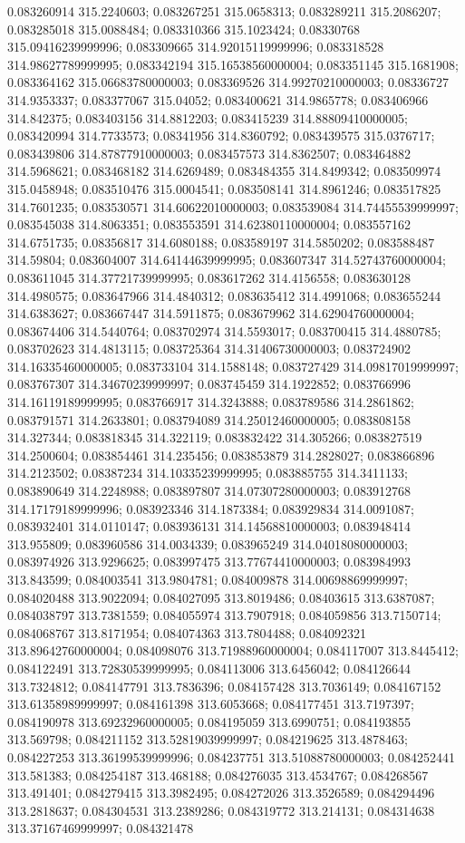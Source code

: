 0.083260914 315.2240603; 0.083267251 315.0658313; 0.083289211 315.2086207; 0.083285018 315.0088484; 0.083310366 315.1023424; 0.08330768 315.09416239999996; 0.083309665 314.92015119999996; 0.083318528 314.98627789999995; 0.083342194 315.16538560000004; 0.083351145 315.1681908; 0.083364162 315.06683780000003; 0.083369526 314.99270210000003; 0.08336727 314.9353337; 0.083377067 315.04052; 0.083400621 314.9865778; 0.083406966 314.842375; 0.083403156 314.8812203; 0.083415239 314.88809410000005; 0.083420994 314.7733573; 0.08341956 314.8360792; 0.083439575 315.0376717; 0.083439806 314.87877910000003; 0.083457573 314.8362507; 0.083464882 314.5968621; 0.083468182 314.6269489; 0.083484355 314.8499342; 0.083509974 315.0458948; 0.083510476 315.0004541; 0.083508141 314.8961246; 0.083517825 314.7601235; 0.083530571 314.60622010000003; 0.083539084 314.74455539999997; 0.083545038 314.8063351; 0.083553591 314.62380110000004; 0.083557162 314.6751735; 0.08356817 314.6080188; 0.083589197 314.5850202; 0.083588487 314.59804; 0.083604007 314.64144639999995; 0.083607347 314.52743760000004; 0.083611045 314.37721739999995; 0.083617262 314.4156558; 0.083630128 314.4980575; 0.083647966 314.4840312; 0.083635412 314.4991068; 0.083655244 314.6383627; 0.083667447 314.5911875; 0.083679962 314.62904760000004; 0.083674406 314.5440764; 0.083702974 314.5593017; 0.083700415 314.4880785; 0.083702623 314.4813115; 0.083725364 314.31406730000003; 0.083724902 314.16335460000005; 0.083733104 314.1588148; 0.083727429 314.09817019999997; 0.083767307 314.34670239999997; 0.083745459 314.1922852; 0.083766996 314.16119189999995; 0.083766917 314.3243888; 0.083789586 314.2861862; 0.083791571 314.2633801; 0.083794089 314.25012460000005; 0.083808158 314.327344; 0.083818345 314.322119; 0.083832422 314.305266; 0.083827519 314.2500604; 0.083854461 314.235456; 0.083853879 314.2828027; 0.083866896 314.2123502; 0.08387234 314.10335239999995; 0.083885755 314.3411133; 0.083890649 314.2248988; 0.083897807 314.07307280000003; 0.083912768 314.17179189999996; 0.083923346 314.1873384; 0.083929834 314.0091087; 0.083932401 314.0110147; 0.083936131 314.14568810000003; 0.083948414 313.955809; 0.083960586 314.0034339; 0.083965249 314.04018080000003; 0.083974926 313.9296625; 0.083997475 313.77674410000003; 0.083984993 313.843599; 0.084003541 313.9804781; 0.084009878 314.00698869999997; 0.084020488 313.9022094; 0.084027095 313.8019486; 0.08403615 313.6387087; 0.084038797 313.7381559; 0.084055974 313.7907918; 0.084059856 313.7150714; 0.084068767 313.8171954; 0.084074363 313.7804488; 0.084092321 313.89642760000004; 0.084098076 313.71988960000004; 0.084117007 313.8445412; 0.084122491 313.72830539999995; 0.084113006 313.6456042; 0.084126644 313.7324812; 0.084147791 313.7836396; 0.084157428 313.7036149; 0.084167152 313.61358989999997; 0.084161398 313.6053668; 0.084177451 313.7197397; 0.084190978 313.69232960000005; 0.084195059 313.6990751; 0.084193855 313.569798; 0.084211152 313.52819039999997; 0.084219625 313.4878463; 0.084227253 313.36199539999996; 0.084237751 313.51088780000003; 0.084252441 313.581383; 0.084254187 313.468188; 0.084276035 313.4534767; 0.084268567 313.491401; 0.084279415 313.3982495; 0.084272026 313.3526589; 0.084294496 313.2818637; 0.084304531 313.2389286; 0.084319772 313.214131; 0.084314638 313.37167469999997; 0.084321478 